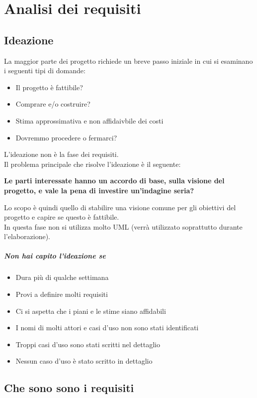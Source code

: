\chapter{Analisi dei requisiti}
\section{Ideazione}
La maggior parte dei progetto richiede un breve passo iniziale in cui
si esaminano i seguenti tipi di domande:
\begin{itemize}
    \item Il progetto è fattibile?
    \item Comprare e/o costruire?
    \item Stima approssimativa e non affidaivbile dei costi
    \item Dovremmo procedere o fermarci?
\end{itemize}
L'ideazione non è la fase dei requisiti.
\\ Il problema principale che risolve l'ideazione è il seguente:
\begin{center}
    \textbf{Le parti interessate hanno un accordo di base, sulla visione
    del progetto, e vale la pena di investire un'indagine seria?}
\end{center}
Lo scopo è quindi quello di stabilire una visione comune per gli obiettivi del progetto
e capire se questo è fattibile.
\\ In questa fase non si utilizza molto UML (verrà utilizzato soprattutto durante
 l'elaborazione).
\paragraph*{Non hai capito l'ideazione se}
\begin{itemize}
    \item Dura più di qualche settimana
    \item Provi a definire molti requisiti
    \item Ci si aspetta che i piani e le stime siano affidabili
    \item I nomi di molti attori e casi d'uso non sono stati identificati
    \item Troppi casi d'uso sono stati scritti nel dettaglio
    \item Nessun caso d'uso è stato scritto in dettaglio
\end{itemize}
\section{Che sono sono i requisiti}
